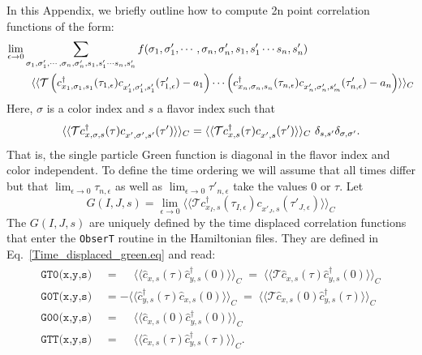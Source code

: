 In this Appendix,  we briefly  outline how to compute 2n point correlation functions   of the form: 
\begin{align}
\label{Time_dispalced_gen.eq}
	\lim_{\epsilon \rightarrow 0  } & \sum_{\sigma_1, \sigma'_1, \cdots, \sigma_n, \sigma'_n,  s_1, s'_1  \cdots s_n,  s'_n  }  f( \sigma_1, \sigma'_1, \cdots, \sigma_n, \sigma'_n,  s_1, s'_1  \cdots s_n,  s'_n ) 
	\nonumber    \\
         &  \, \, \, \,        \langle \langle {\cal T}  \left( c^{\dagger}_{x_1,\sigma_1,s_1}(\tau_{1,\epsilon}) c^{\phantom\dagger}_{x'_{1},\sigma'_1,s'_1}(\tau'_{1,\epsilon}) - a_1  \right)  \cdots 
	    \left( c^{\dagger}_{x_n,\sigma_n,s_n}(\tau_{n,\epsilon}) c^{\phantom\dagger}_{x'_{n},\sigma'_n,s'_m} (\tau'_{n,\epsilon}) - a_n  \right)   \rangle \rangle_C
\end{align}
Here,  $ \sigma $ is a color  index and $s$ a flavor index such that 
\begin{equation}
	\langle \langle {\cal T}  c^{\dagger}_{x,\sigma,s}(\tau) c^{\phantom\dagger}_{x',\sigma',s'}(\tau')  \rangle \rangle_C  = 
	\langle \langle {\cal T}  c^{\dagger}_{x,s}(\tau) c^{\phantom\dagger}_{x',s}(\tau')  \rangle \rangle_C  \, \, \delta_{s,s'} \delta_{\sigma,\sigma'}.
\end{equation}
That is, the single particle Green function is diagonal in the flavor index  and color  independent.   To  define the time ordering we will assume  that all times differ  but that $  \lim_{\epsilon \rightarrow 0 }    \tau_{n,\epsilon}  $   as well as $ \lim_{\epsilon \rightarrow 0 }    \tau'_{n,\epsilon} $  take the values $0$  or $\tau$.  
Let
\begin{equation}
	G(I,J,s)   =  \lim_{\epsilon \rightarrow 0 }\langle \langle   \mathcal{T}   c^{\dagger}_{x_I,s}(\tau_{I,\epsilon}) c^{\phantom\dagger}_{x'_{J},s}(\tau'_{J,\epsilon})  \rangle \rangle_{C} 
\end{equation}
The $G(I,J,s)  $  are  uniquely defined by the time  displaced correlation   functions  that enter  the \texttt{ObserT}   routine in the Hamiltonian files.  They are defined in Eq.~\ref{Time_displaced_green.eq} and read: 
\begin{align}
\begin{aligned}
\texttt{GT0(x,y,s) }  &=   \phantom{+} \langle \langle \hat{c}^{\phantom\dagger}_{x,s} (\tau)   \hat{c}^{\dagger}_{y,s} (0)   \rangle \rangle_C \;=\; \langle \langle \mathcal{T} \hat{c}^{\phantom\dagger}_{x,s} (\tau)   \hat{c}^{\dagger}_{y,s} (0)   \rangle \rangle_C   \\
\texttt{G0T(x,y,s) }   &=  -   \langle \langle   \hat{c}^{\dagger}_{y,s} (\tau)    \hat{c}^{\phantom\dagger}_{x,s} (0)    \rangle \rangle_C \;=\;
    \langle \langle \mathcal{T} \hat{c}^{\phantom\dagger}_{x,s} (0)    \hat{c}^{\dagger}_{y,s} (\tau)   \rangle \rangle_C  \\
  \texttt{G00(x,y,s) }  &=    \phantom{+} \langle \langle \hat{c}^{\phantom\dagger}_{x,s} (0)   \hat{c}^{\dagger}_{y,s} (0)   \rangle \rangle_C    \\
    \texttt{GTT(x,y,s) }  &=   \phantom{+} \langle \langle \hat{c}^{\phantom\dagger}_{x,s} (\tau)   \hat{c}^{\dagger}_{y,s} (\tau)   \rangle \rangle_C.
\end{aligned}
\end{align}

